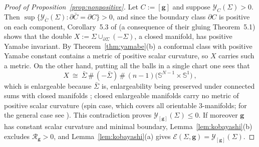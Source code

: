 \documentclass[aps,prd,reprint,amsmath,amssymb,nofootinbib,longbibliography]{revtex4-2}
\newcommand{\Sph}{\mathbb{S}}
\newcommand{\g}{\mathbf{g}}                 %
\newcommand{\Rs}{\mathcal{R}}               %
\newcommand{\Sigbar}{\bar{\Sigma}}          %
\newcommand{\EH}{\mathcal{E}}               %
\newcommand{\Y}{\mathcal{Y}}                %
\theoremstyle{plain}
\theoremstyle{definition}
\theoremstyle{remark}
\begin{document}
\begin{proof}[Proof of Proposition~\ref{prop:nonpositive}]
Let $C:=[\g]$ and suppose $\Y_C(\Sigma)>0$. Then $\sup\{\Y_{\bar C}(\Sigma):\partial\bar C=\partial C\}>0$, and since the boundary class $\partial C$ is positive on each component, Corollary~5.3 of \cite{MR1957657} (a consequence of their gluing Theorem~5.1) shows that the double $X:=\Sigma\cup_{\partial\Sigma}(-\Sigma)$, a closed manifold, has positive Yamabe invariant. By Theorem~\ref{thm:yamabe}(b) a conformal class with positive Yamabe constant contains a metric of positive scalar curvature, so $X$ carries such a metric. On the other hand, putting all the balls in a single chart one sees that
\begin{equation*}
X\ \cong\ \Sigbar\,\#\,(-\Sigbar)\,\#\,(n-1)\big(\Sph^{N-1}\times\Sph^1\big)\ ,
\end{equation*}
which is enlargeable because $\Sigbar$ is, enlargeability being preserved under connected sums with closed manifolds \cite{MR569070}; closed enlargeable manifolds carry no metric of positive scalar curvature \cite{MR569070} (spin case, which covers all orientable $3$-manifolds; for the general case see \cite{MR4232210}). This contradiction proves $\Y_{[\g]}(\Sigma)\le0$. If moreover $\g$ has constant scalar curvature and minimal boundary, Lemma~\ref{lem:kobayashi}(b) excludes $\Rs_\g>0$, and Lemma~\ref{lem:kobayashi}(a) gives $\EH(\Sigma,\g)=\Y_{[\g]}(\Sigma)$.
\end{proof}
\end{document}
